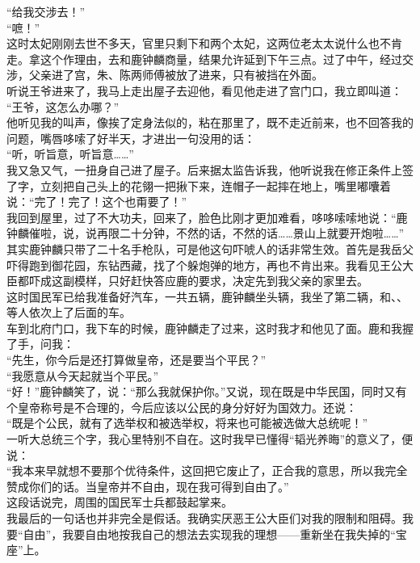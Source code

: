 “给我交涉去！”\\

“嗻！”\\

这时太妃刚刚去世不多天，官里只剩下和两个太妃，这两位老太太说什么也不肯走。拿这个作理由，去和鹿钟麟商量，结果允许延到下午三点。过了中午，经过交涉，父亲进了宫，朱、陈两师傅被放了进来，只有被挡在外面。\\

听说王爷进来了，我马上走出屋子去迎他，看见他走进了宫门口，我立即叫道：\\

“王爷，这怎么办哪？”\\

他听见我的叫声，像挨了定身法似的，粘在那里了，既不走近前来，也不回答我的问题，嘴唇哆嗦了好半天，才进出一句没用的话：\\

“听，听旨意，听旨意……”\\

我又急又气，一扭身自己进了屋子。后来据太监告诉我，他听说我在修正条件上签了字，立刻把自己头上的花翎一把揪下来，连帽子一起摔在地上，嘴里嘟囔着说：“完了！完了！这个也甭要了！”\\

我回到屋里，过了不大功夫，回来了，脸色比刚才更加难看，哆哆嗦嗦地说：“鹿钟麟催啦，说，说再限二十分钟，不然的话，不然的话……景山上就要开炮啦……”\\

其实鹿钟麟只带了二十名手枪队，可是他这句吓唬人的话非常生效。首先是我岳父吓得跑到御花园，东钻西藏，找了个躲炮弹的地方，再也不肯出来。我看见王公大臣都吓成这副模样，只好赶快答应鹿的要求，决定先到我父亲的家里去。\\

这时国民军已给我准备好汽车，一共五辆，鹿钟麟坐头辆，我坐了第二辆，和、、等人依次上了后面的车。\\

车到北府门口，我下车的时候，鹿钟麟走了过来，这时我才和他见了面。鹿和我握了手，问我：\\

“先生，你今后是还打算做皇帝，还是要当个平民？”\\

“我愿意从今天起就当个平民。”\\

“好！”鹿钟麟笑了，说：“那么我就保护你。”又说，现在既是中华民国，同时又有个皇帝称号是不合理的，今后应该以公民的身分好好为国效力。还说：\\

“既是个公民，就有了选举权和被选举权，将来也可能被选做大总统呢！”\\

一听大总统三个字，我心里特别不自在。这时我早已懂得“韬光养晦”的意义了，便说：\\

“我本来早就想不要那个优待条件，这回把它废止了，正合我的意思，所以我完全赞成你们的话。当皇帝并不自由，现在我可得到自由了。”\\

这段话说完，周围的国民军士兵都鼓起掌来。\\

我最后的一句话也并非完全是假话。我确实厌恶王公大臣们对我的限制和阻碍。我要“自由”，我要自由地按我自己的想法去实现我的理想——重新坐在我失掉的“宝座”上。
